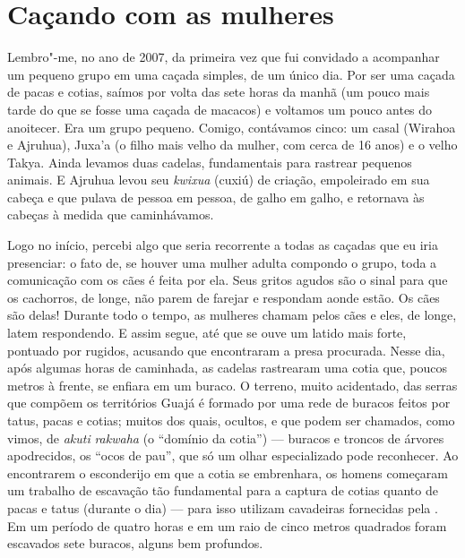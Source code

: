 \section{Caçando com as mulheres}

Lembro"-me, no ano de 2007, da primeira vez que fui convidado a
acompanhar um pequeno grupo em uma caçada simples, de um único dia. Por
ser uma caçada de pacas e cotias, saímos por volta das sete horas da
manhã (um pouco mais tarde do que se fosse uma caçada de macacos) e
voltamos um pouco antes do anoitecer. Era um grupo pequeno. Comigo,
contávamos cinco: um casal (Wirahoa e Ajruhua), Juxa'a (o filho mais
velho da mulher, com cerca de 16 anos) e o velho Takya. Ainda levamos
duas cadelas, fundamentais para rastrear pequenos animais. E Ajruhua
levou seu \emph{kwixua} (cuxiú) de criação, empoleirado em sua cabeça e
que pulava de pessoa em pessoa, de galho em galho, e retornava às
cabeças à medida que caminhávamos.

Logo no início, percebi algo que seria recorrente a todas as caçadas que
eu iria presenciar: o fato de, se houver uma mulher adulta compondo o
grupo, toda a comunicação com os cães é feita por ela. Seus gritos
agudos são o sinal para que os cachorros, de longe, não parem de farejar
e respondam aonde estão. Os cães são delas! Durante todo o tempo, as
mulheres chamam pelos cães e eles, de longe, latem respondendo. E assim
segue, até que se ouve um latido mais forte, pontuado por rugidos,
acusando que encontraram a presa procurada. Nesse dia, após algumas
horas de caminhada, as cadelas rastrearam uma cotia que, poucos metros à
frente, se enfiara em um buraco. O terreno, muito acidentado, das serras
que compõem os territórios Guajá é formado por uma rede de buracos
feitos por tatus, pacas e cotias; muitos dos quais, ocultos, e que podem
ser chamados, como vimos, de \emph{akuti} \emph{rakwaha} (o ``domínio da
cotia'') --- buracos e troncos de árvores apodrecidos, os ``ocos de pau'',
que só um olhar especializado pode reconhecer. Ao encontrarem o
esconderijo em que a cotia se embrenhara, os homens começaram um
trabalho de escavação tão fundamental para a captura de cotias quanto de
pacas e tatus (durante o dia) --- para isso utilizam cavadeiras fornecidas
pela . Em um período de quatro horas e em um raio de cinco metros
quadrados foram escavados sete buracos, alguns bem profundos.

